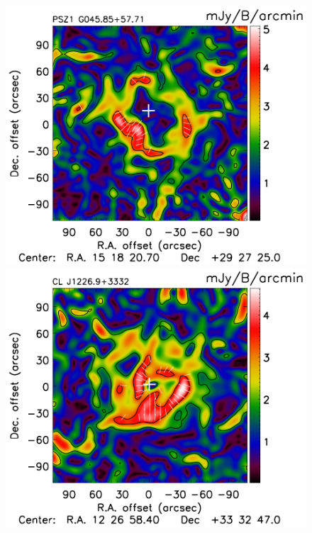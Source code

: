 \documentclass[twocolumn,traditabstract]{aa}
\begin{document}
\begin{figure}[h]
\includegraphics[trim=0cm 0cm 0cm 0cm, clip=true, totalheight=3.8cm]{Figure/Grad_PSZ1G045_15_15_45.pdf}
\includegraphics[trim=0cm 0cm 0cm 0cm, clip=true, totalheight=3.8cm]{Figure/Grad_CLJ1227_15_15_45.pdf}

\end{figure}
\end{document}
